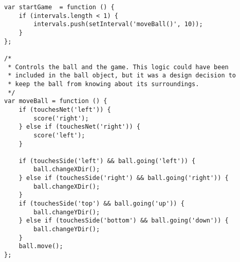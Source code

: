 \documentclass[a4paper,10pt]{article}
\begin{document}
\begin{verbatim}
var startGame  = function () {
    if (intervals.length < 1) {
        intervals.push(setInterval('moveBall()', 10));
    }
};

/*
 * Controls the ball and the game. This logic could have been
 * included in the ball object, but it was a design decision to
 * keep the ball from knowing about its surroundings.
 */
var moveBall = function () {
    if (touchesNet('left')) {
        score('right');
    } else if (touchesNet('right')) {
        score('left');
    }

    if (touchesSide('left') && ball.going('left')) {
        ball.changeXDir();
    } else if (touchesSide('right') && ball.going('right')) {
        ball.changeXDir();
    }
    if (touchesSide('top') && ball.going('up')) {
        ball.changeYDir();
    } else if (touchesSide('bottom') && ball.going('down')) {
        ball.changeYDir();
    }
    ball.move();
};


\end{verbatim}
\end{document}
